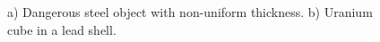 \documentclass[a4paper]{panl}
\begin{document}
\begin{figure}[t]
    \begin{center}
        \begin{minipage}[h]{0.49\linewidth}
\end{minipage}
\hfill
\begin{minipage}[h]{0.49\linewidth}
\end{minipage}   
        \vspace{-3mm}
        \caption{a) Dangerous steel object with non-uniform thickness. b) Uranium cube in a lead shell.}
    \end{center}
    \vspace{-5mm}
\end{figure}
\end{document}
